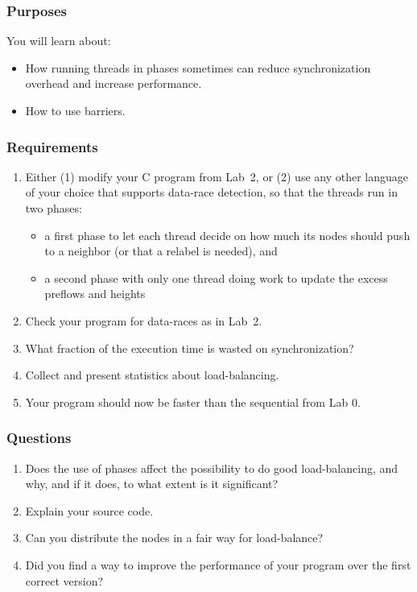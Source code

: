 \documentclass{forsete}
\begin{document}
\subsubsection*{Purposes}
You will learn about:
\begin{itemize}
\item How running threads in phases sometimes can reduce synchronization overhead and increase performance.
\item How to use barriers.
\end{itemize}

\subsubsection*{Requirements}
\begin{enumerate}
\item Either (1) modify your C program from Lab~2, or (2) use any other language of your choice that
supports data-race detection, so that the threads run in two phases:
\begin{itemize}
\item a first phase to let each thread decide on how much its nodes should push to a neighbor (or that a relabel is needed), and
\item a second phase with only one thread doing work to update the excess preflows and heights
\end{itemize}
\item Check your program for data-races as in Lab~2.

\item What fraction of the execution time is wasted on synchronization?

\item Collect and present statistics about load-balancing.
\item Your program should now be faster than the sequential from Lab 0.
\end{enumerate}

\subsubsection*{Questions}
\begin{enumerate}
\item Does the use of phases affect the possibility to do good load-balancing, and why, and if it does, to 
what extent is it significant?
\item Explain your source code.
\item Can you distribute the nodes in a fair way for load-balance?
\item Did you find a way to improve the performance of your program over the first correct version?

\end{enumerate}
\end{document}
